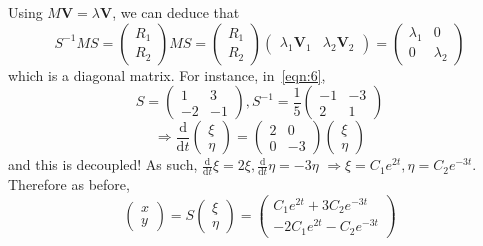 \documentclass[12pt]{report}
\theoremstyle{definition}
\begin{document}
Using $M\mathbf{V} = \lambda \mathbf{V}$, we can deduce that\[
    S^{-1}MS = \begin{pmatrix}
            R_1 \\
            R_2
    \end{pmatrix} MS = \begin{pmatrix}
            R_1 \\
            R_2
    \end{pmatrix} \begin{pmatrix}
    \lambda_1 \mathbf{V}_1 & \lambda_2 \mathbf{V}_2
    \end{pmatrix} = \begin{pmatrix}
    \lambda_1 & 0 \\
    0 & \lambda_2
    \end{pmatrix} 
\]which is a diagonal matrix. 
For instance, in~\eqref{eqn:6}, \[
    S = \begin{pmatrix}
        1 & 3 \\
        -2 & -1
    \end{pmatrix}, S^{-1} = \frac{1}{5} \begin{pmatrix}
        -1 & -3 \\
        2 & 1
    \end{pmatrix} 
\]\[
    \Rightarrow{}\frac{\mathrm{d}}{\mathrm{d}t} \begin{pmatrix}
            \xi \\
            \eta
    \end{pmatrix} = \begin{pmatrix}
    2 & 0 \\
    0 & -3
    \end{pmatrix} \begin{pmatrix}
            \xi \\
            \eta
    \end{pmatrix}
\]and this is decoupled!
As such, $\frac{\mathrm{d}}{\mathrm{d}t} \xi = 2\xi, \frac{\mathrm{d}}{\mathrm{d}t} \eta = -3\eta$
$\Rightarrow{}\xi = C_1 e^{2t}, \eta = C_2 e^{-3t}$. Therefore as before, \[
    \begin{pmatrix}
            x \\
            y
    \end{pmatrix}  = S\begin{pmatrix}
            \xi \\
            \eta
    \end{pmatrix} = \begin{pmatrix}
            C_1 e^{2t} + 3C_2 e^{-3t} \\
            -2C_1 e^{2t} - C_2 e^{-3t}
    \end{pmatrix} 
\]
\end{document}

